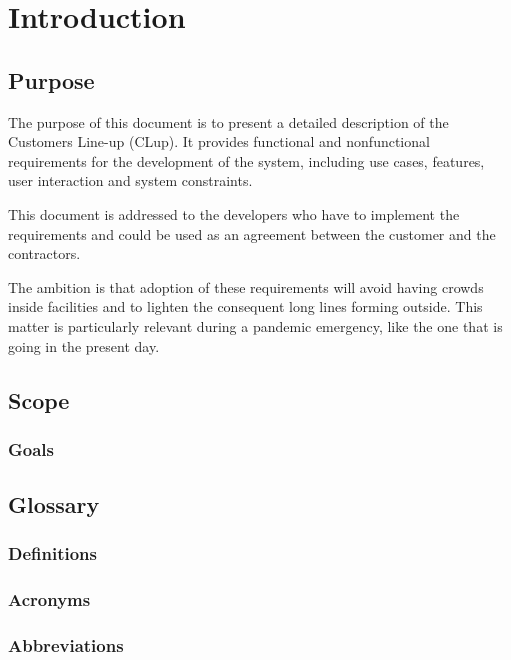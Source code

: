 \chapter{Introduction}

\section{Purpose}
The purpose of this document is to present a detailed description of the Customers Line-up (CLup).
It provides functional and nonfunctional requirements for the development of the system, including use cases, features, user interaction and system constraints.

This document is addressed to the developers who have to implement the requirements and could be used as an agreement between the customer and the contractors.

The ambition is that adoption of these requirements will avoid having crowds inside facilities and to lighten the consequent long lines forming outside. This matter is particularly relevant during a pandemic emergency, like the one that is going in the present day.

\section{Scope}

\subsection{Goals}

\section{Glossary}
\subsection{Definitions}
\subsection{Acronyms}
\subsection{Abbreviations}